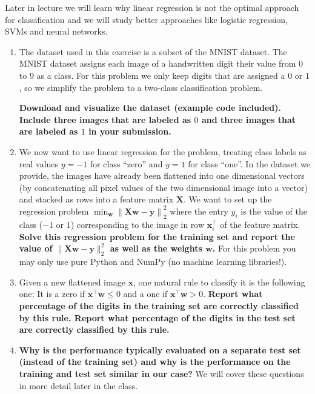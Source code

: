 \documentclass{article}\usepackage[utf8]{inputenc}\usepackage[margin=0.4cm,top=0.4cm,bottom=0.4cm]{geometry}\usepackage[usenames,dvipsnames,svgnames,table]{xcolor}
\newcommand{\norm}[1]{\left\lVert#1\right\rVert}
\begin{document}
\noindent Later in lecture we will learn why linear regression is not the optimal approach for classification and we will study better approaches like logistic regression, SVMs and neural networks.
\begin{enumerate}
\item The dataset used in this exercise is a subset of the MNIST dataset. The MNIST dataset assigns each image of a handwritten digit their value from $0$ to $9$ as a class. For this problem we only keep digits that are assigned a $0$ or $1$, so we simplify the problem to a two-class classification problem.
\vspace{3pt}

\textbf{Download and visualize the dataset (example code included). Include three images that are labeled as $0$ and three images that are labeled as $1$ in your submission.}
\BeginSolution

\EndSolution
\item We now want to use linear regression for the problem, treating class labels as real values $y = -1$ for class ``zero'' and $y = 1$ for class ``one''. In the dataset we provide, the images have already been flattened into one dimensional vectors (by concatenating all pixel values of the two dimensional image into a vector) and stacked as rows into a feature matrix $\mathbf{X}$. We want to set up the regression problem $\min_{\mathbf{w}}\norm{\mathbf{X}\mathbf{w} - \mathbf{y}}_2^2$ where the entry $y_i$ is the value of the class ($-1$ or $1$) corresponding to the image in row $\mathbf{x}_i^\top$ of the feature matrix. \textbf{Solve this regression problem for the training set and report the value of $\|\mathbf{X}\mathbf{w} - \mathbf{y}\|_2^2$ as well as the weights $\mathbf{w}$.} For this problem you may only use pure Python and NumPy (no machine learning libraries!).
\BeginSolution

\EndSolution
\item Given a new flattened image $\mathbf{x}$, one natural rule to classify it is the following one: It is a zero if $\mathbf{x}^\top \mathbf{w} \leqslant 0$ and a one if $\mathbf{x}^\top \mathbf{w} > 0$. \textbf{Report what percentage of the digits in the training set are correctly classified by this rule. Report what percentage of the digits in the test set are correctly classified by this rule.}
\BeginSolution

\EndSolution
\item \textbf{Why is the performance typically evaluated on a separate test set (instead of the training set) and why is the performance on the training and test set similar in our case?} We will cover these questions in more detail later in the class.
\BeginSolution


\end{enumerate}
\end{document}
